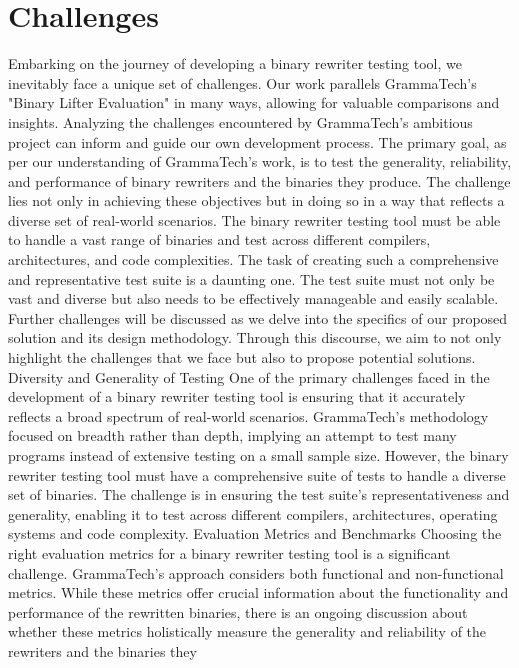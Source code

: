 \documentclass[a4paper,11pt,oneside]{report}
\begin{document}
\chapter{Challenges}

Embarking on the journey of developing a binary rewriter testing tool, we inevitably
face a unique set of challenges. Our work parallels GrammaTech's "Binary Lifter Evaluation"
in many ways, allowing for valuable comparisons and insights. Analyzing the challenges
encountered by GrammaTech's ambitious project can inform and guide our own
development process.
The primary goal, as per our understanding of GrammaTech's work, is to test the
generality, reliability, and performance of binary rewriters and the binaries they produce.
The challenge lies not only in achieving these objectives but in doing so in a way that reflects
a diverse set of real-world scenarios. The binary rewriter testing tool must be able to handle
a vast range of binaries and test across different compilers, architectures, and code
complexities.
The task of creating such a comprehensive and representative test suite is a daunting
one. The test suite must not only be vast and diverse but also needs to be effectively
manageable and easily scalable. Further challenges will be discussed as we delve into the
specifics of our proposed solution and its design methodology. Through this discourse, we
aim to not only highlight the challenges that we face but also to propose potential solutions.
Diversity and Generality of Testing
One of the primary challenges faced in the development of a binary rewriter testing
tool is ensuring that it accurately reflects a broad spectrum of real-world scenarios.
GrammaTech's methodology focused on breadth rather than depth, implying an attempt to
test many programs instead of extensive testing on a small sample size. However, the binary
rewriter testing tool must have a comprehensive suite of tests to handle a diverse set of
binaries. The challenge is in ensuring the test suite's representativeness and generality,
enabling it to test across different compilers, architectures, operating systems and code
complexity.
Evaluation Metrics and Benchmarks
Choosing the right evaluation metrics for a binary rewriter testing tool is a significant
challenge. GrammaTech's approach considers both functional and non-functional metrics.
While these metrics offer crucial information about the functionality and performance of
the rewritten binaries, there is an ongoing discussion about whether these metrics
holistically measure the generality and reliability of the rewriters and the binaries they
\end{document}
